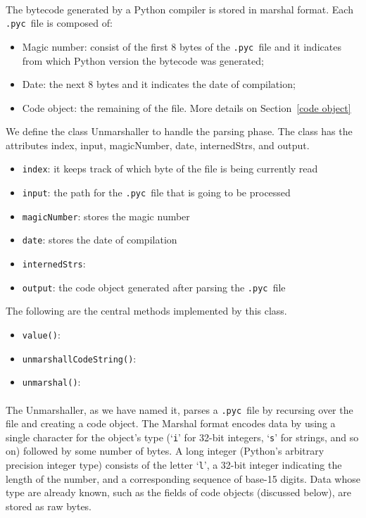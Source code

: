 \documentclass{article}
\newcommand{\pyc}{\texttt{.pyc~}}
\begin{document}
\paragraph{}
The bytecode generated by a Python compiler is stored in marshal format. Each \pyc file is composed of:

\begin{itemize}
	\item Magic number: consist of the first 8 bytes of the \pyc file and it indicates from which Python version the bytecode was generated;
	\item Date: the next 8 bytes and it indicates the date of compilation;
	\item Code object: the remaining of the file. More details on Section~\ref{code object}
\end{itemize}

We define the class Unmarshaller to handle the parsing phase. The class has the attributes index, input, magicNumber, date, internedStrs, and output.

\begin{itemize}
	\item \texttt{index}: it keeps track of which byte of the file is being currently read 
	\item \texttt{input}: the path for the \pyc file that is going to be processed
	\item \texttt{magicNumber}: stores the magic number
	\item \texttt{date}: stores the date of compilation
	\item \texttt{internedStrs}:
	\item \texttt{output}: the code object generated after parsing the \pyc file
\end{itemize}

The following are the central methods implemented by this class.

\begin{itemize}
	\item \texttt{value()}:
	\item \texttt{unmarshallCodeString()}:
	\item \texttt{unmarshal()}:
\end{itemize}

\paragraph{}
The Unmarshaller, as we have named it, parses a \pyc file by recursing over the file and creating a code object. The Marshal format encodes data by using a single character for the object's type (`\texttt{i}' for 32-bit integers, `\texttt{s}' for strings, and so on) followed by some number of bytes. A long integer (Python's arbitrary precision integer type) consists of the letter `\texttt{l}', a 32-bit integer indicating the length of the number, and a corresponding sequence of base-15 digits. Data whose type are already known, such as the fields of code objects (discussed below), are stored as raw bytes.
\end{document}
